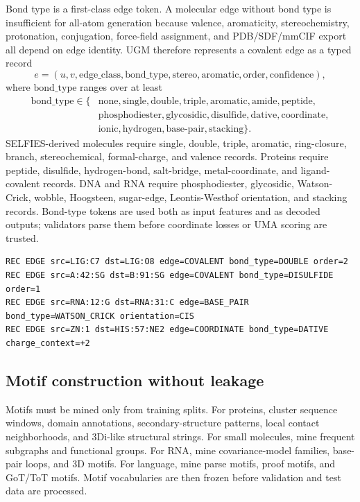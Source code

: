 \documentclass[11pt]{article}
\newcommand{\1}{\mathbf{1}}
\newcommand{\UGM}{\textsc{UGM}}
\begin{document}
Bond type is a first-class edge token. A molecular edge without bond type is insufficient for all-atom generation because valence, aromaticity, stereochemistry, protonation, conjugation, force-field assignment, and PDB/SDF/mmCIF export all depend on edge identity. \UGM{} therefore represents a covalent edge as a typed record
\[
  e=(u,v,\mathrm{edge\_class},\mathrm{bond\_type},\mathrm{stereo},\mathrm{aromatic},\mathrm{order},\mathrm{confidence}),
\]
where \(\mathrm{bond\_type}\) ranges over at least
\[
\begin{aligned}
\mathrm{bond\_type}\in\{&\text{none},\text{single},\text{double},\text{triple},\text{aromatic},\text{amide},\text{peptide},\\
&\text{phosphodiester},\text{glycosidic},\text{disulfide},\text{dative},\text{coordinate},\\
&\text{ionic},\text{hydrogen},\text{base-pair},\text{stacking}\}.
\end{aligned}
\]
SELFIES-derived molecules require single, double, triple, aromatic, ring-closure, branch, stereochemical, formal-charge, and valence records. Proteins require peptide, disulfide, hydrogen-bond, salt-bridge, metal-coordinate, and ligand-covalent records. DNA and RNA require phosphodiester, glycosidic, Watson-Crick, wobble, Hoogsteen, sugar-edge, Leontis-Westhof orientation, and stacking records. Bond-type tokens are used both as input features and as decoded outputs; validators parse them before coordinate losses or UMA scoring are trusted.

\begin{lstlisting}[caption={Bond-type-aware edge records.}]
REC EDGE src=LIG:C7 dst=LIG:O8 edge=COVALENT bond_type=DOUBLE order=2
REC EDGE src=A:42:SG dst=B:91:SG edge=COVALENT bond_type=DISULFIDE order=1
REC EDGE src=RNA:12:G dst=RNA:31:C edge=BASE_PAIR bond_type=WATSON_CRICK orientation=CIS
REC EDGE src=ZN:1 dst=HIS:57:NE2 edge=COORDINATE bond_type=DATIVE charge_context=+2
\end{lstlisting}

\subsection{Motif construction without leakage}

Motifs must be mined only from training splits. For proteins, cluster sequence windows, domain annotations, secondary-structure patterns, local contact neighborhoods, and 3Di-like structural strings. For small molecules, mine frequent subgraphs and functional groups. For RNA, mine covariance-model families, base-pair loops, and 3D motifs. For language, mine parse motifs, proof motifs, and GoT/ToT motifs. Motif vocabularies are then frozen before validation and test data are processed.
\end{document}
